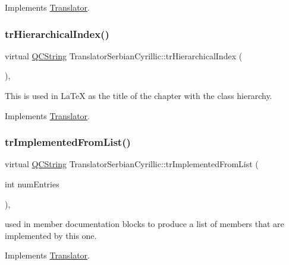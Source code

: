 Implements \mbox{\hyperlink{class_translator}{Translator}}.

\mbox{\label{class_translator_serbian_cyrillic_a8b35d7c5687fa3656ecc5e56ce751d26}} 
\subsubsection{\texorpdfstring{trHierarchicalIndex()}{trHierarchicalIndex()}}
{\footnotesize\ttfamily virtual \mbox{\hyperlink{class_q_c_string}{Q\+C\+String}} Translator\+Serbian\+Cyrillic\+::tr\+Hierarchical\+Index (\begin{DoxyParamCaption}{ }\end{DoxyParamCaption})\hspace{0.3cm}{\ttfamily [inline]}, {\ttfamily [virtual]}}

This is used in La\+TeX as the title of the chapter with the class hierarchy. 

Implements \mbox{\hyperlink{class_translator}{Translator}}.

\mbox{\label{class_translator_serbian_cyrillic_a993e76a71b8379cf8ea8dfdd3cd33ff8}} 
\subsubsection{\texorpdfstring{trImplementedFromList()}{trImplementedFromList()}}
{\footnotesize\ttfamily virtual \mbox{\hyperlink{class_q_c_string}{Q\+C\+String}} Translator\+Serbian\+Cyrillic\+::tr\+Implemented\+From\+List (\begin{DoxyParamCaption}\item[{int}]{num\+Entries }\end{DoxyParamCaption})\hspace{0.3cm}{\ttfamily [inline]}, {\ttfamily [virtual]}}

used in member documentation blocks to produce a list of members that are implemented by this one. 

Implements \mbox{\hyperlink{class_translator}{Translator}}.


